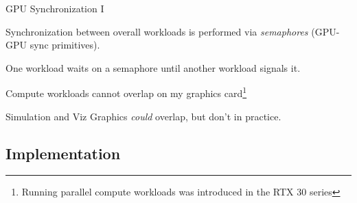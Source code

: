 \begin{frame}{GPU Synchronization I}
{\begin{tikzpicture}[
            scale=0.9, every node/.style={scale=0.9},
        fixedrect/.style={rectangle,draw,minimum height=4em,anchor=west,text width=2cm,align=center},
        ]
        \end{tikzpicture}
    }

    \vfill\null
    
    \begin{wideitemize}
        \item Synchronization between overall workloads is performed via \emph{semaphores} (GPU-GPU sync primitives)\todocite{}.
        \item One workload waits on a semaphore until another workload signals it.
        \item Compute workloads cannot overlap on my graphics card\footnote{Running parallel compute workloads was introduced in the RTX 30 series\todocite{}}
        \item Simulation and Viz Graphics \emph{could} overlap, but don't in practice.
    \end{wideitemize}
\end{frame}


\subsection{Implementation}

